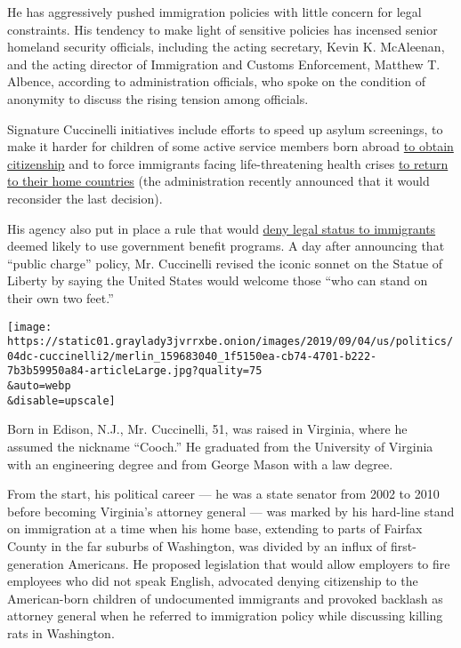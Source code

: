 He has aggressively pushed immigration policies with little concern for
legal constraints. His tendency to make light of sensitive policies has
incensed senior homeland security officials, including the acting
secretary, Kevin K. McAleenan, and the acting director of Immigration
and Customs Enforcement, Matthew T. Albence, according to administration
officials, who spoke on the condition of anonymity to discuss the rising
tension among officials.

Signature Cuccinelli initiatives include efforts to speed up asylum
screenings, to make it harder for children of some active service
members born abroad
\href{https://www.nytimes3xbfgragh.onion/2019/08/29/us/politics/citizenship-service-members.html}{to
obtain citizenship} and to force immigrants facing life-threatening
health crises
\href{https://www.nytimes3xbfgragh.onion/2019/08/29/us/immigrant-medical-treatment-deferred-action.html}{to
return to their home countries} (the administration recently announced
that it would reconsider the last decision).

His agency also put in place a rule that would
\href{https://www.nytimes3xbfgragh.onion/2019/08/14/us/immigration-public-charge-welfare.html}{deny
legal status to immigrants} deemed likely to use government benefit
programs. A day after announcing that ``public charge'' policy, Mr.
Cuccinelli revised the iconic sonnet on the Statue of Liberty by saying
the United States would welcome those ``who can stand on their own two
feet.''

\texttt{[image: https://static01.graylady3jvrrxbe.onion/images/2019/09/04/us/politics/04dc-cuccinelli2/merlin\_159683040\_1f5150ea-cb74-4701-b222-7b3b59950a84-articleLarge.jpg?quality=75\\\&auto=webp\\\&disable=upscale]}

Born in Edison, N.J., Mr. Cuccinelli, 51, was raised in Virginia, where
he assumed the nickname ``Cooch.'' He graduated from the University of
Virginia with an engineering degree and from George Mason with a law
degree.

From the start, his political career --- he was a state senator from
2002 to 2010 before becoming Virginia's attorney general --- was marked
by his hard-line stand on immigration at a time when his home base,
extending to parts of Fairfax County in the far suburbs of Washington,
was divided by an influx of first-generation Americans. He proposed
legislation that would allow employers to fire employees who did not
speak English, advocated denying citizenship to the American-born
children of undocumented immigrants and provoked backlash as attorney
general when he referred to immigration policy while discussing killing
rats in Washington.


